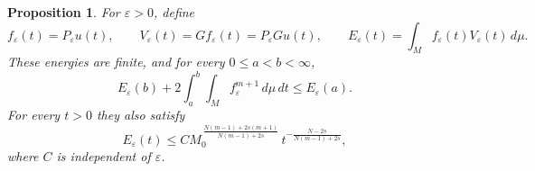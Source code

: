 \documentclass[11pt]{article}
\newtheorem{proposition}[theorem]{Proposition}
\theoremstyle{definition}
\theoremstyle{remark}
\newcommand{\dd}{\,d\mu}
\newcommand{\intM}{\int_M}
\begin{document}
\begin{proposition}\label{prop:energy}
For \(\varepsilon>0\), define
\[
 f_\varepsilon(t)=P_\varepsilon u(t),\qquad
 V_\varepsilon(t)=Gf_\varepsilon(t)=P_\varepsilon Gu(t),
 \qquad E_\varepsilon(t)=\intM f_\varepsilon(t)V_\varepsilon(t)\dd .
\]
These energies are finite, and for every \(0\le a<b<\infty\),
\begin{equation}\label{eq:dissipation}
 E_\varepsilon(b)+2\int_a^b\!\intM f_\varepsilon^{m+1}\dd\,dt
 \le E_\varepsilon(a).
\end{equation}
For every \(t>0\) they also satisfy
\begin{equation}\label{eq:energybound}
 E_\varepsilon(t)\le
 C M_0^{\,\frac{N(m-1)+2s(m+1)}{N(m-1)+2s}}\,
 t^{-\frac{N-2s}{N(m-1)+2s}},
\end{equation}
where \(C\) is independent of \(\varepsilon\).
\end{proposition}
\end{document}
